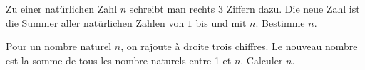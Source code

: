 Zu einer natürlichen Zahl $n$ schreibt man rechts 3 Ziffern dazu. Die neue Zahl ist die Summer aller natürlichen Zahlen von $1$ bis und mit $n$. Bestimme $n$.

\bigskip

Pour un nombre naturel $n$, on rajoute à droite trois chiffres. Le nouveau nombre est la somme de tous les nombre naturels entre 1 et $n$. Calculer $n$.